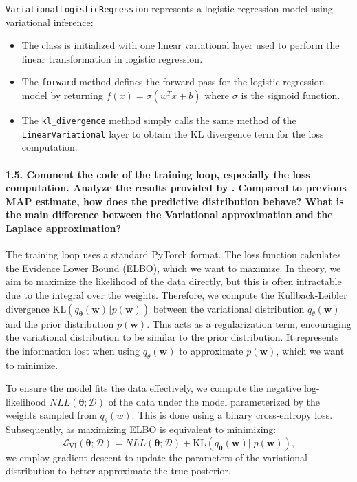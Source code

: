 \noindent\texttt{VariationalLogisticRegression} represents a logistic regression model using variational inference:
\begin{itemize}
    \item The class is initialized with one linear variational layer used to perform the linear transformation in logistic regression.
    \item The \texttt{forward} method defines the forward pass for the logistic regression model by returning $f(x) = \sigma(w^T x + b)$ where $\sigma$ is the sigmoid function. 
    \item The \texttt{kl\_divergence} method simply calls the same method of the \texttt{LinearVariational} layer to obtain the KL divergence term for the loss computation.
\end{itemize}

\paragraph{1.5. Comment the code of the training loop, especially the loss computation. Analyze the results provided by . Compared to previous MAP estimate, how does the predictive distribution behave? What is the main difference between the Variational approximation and the Laplace approximation?}

The training loop uses a standard PyTorch format. The loss function calculates the Evidence Lower Bound (ELBO), which we want to maximize. In theory, we aim to maximize the likelihood of the data directly, but this is often intractable due to the integral over the weights. Therefore, we compute the Kullback-Leibler divergence $\textrm{KL}(q_{\boldsymbol{\theta}}(\boldsymbol{w}) \Vert p(\boldsymbol{w}))$ between the variational distribution $q_{\theta}(\boldsymbol{w})$ and the prior distribution $p(\boldsymbol{w})$. This acts as a regularization term, encouraging the variational distribution to be similar to the prior distribution. It represents the information lost when using $q_{\theta}(\boldsymbol{w})$ to approximate $p(\boldsymbol{w})$, which we want to minimize. 

To ensure the model fits the data effectively, we compute the negative log-likelihood $NLL(\boldsymbol{\theta}; \mathcal{D})$ of the data under the model parameterized by the weights sampled from $q_{\theta}(w)$. This is done using a binary cross-entropy loss. Subsequently, as maximizing ELBO is equivalent to minimizing: \[ \mathcal{L}_{\textrm{VI}}(\boldsymbol{\theta}; \mathcal{D}) = NLL(\boldsymbol{\theta}; \mathcal{D}) + \textrm{KL}(q_{\boldsymbol{\theta}}(\boldsymbol{w})\vert\vert p(\boldsymbol{w})),\] we employ gradient descent to update the parameters of the variational distribution to better approximate the true posterior.


